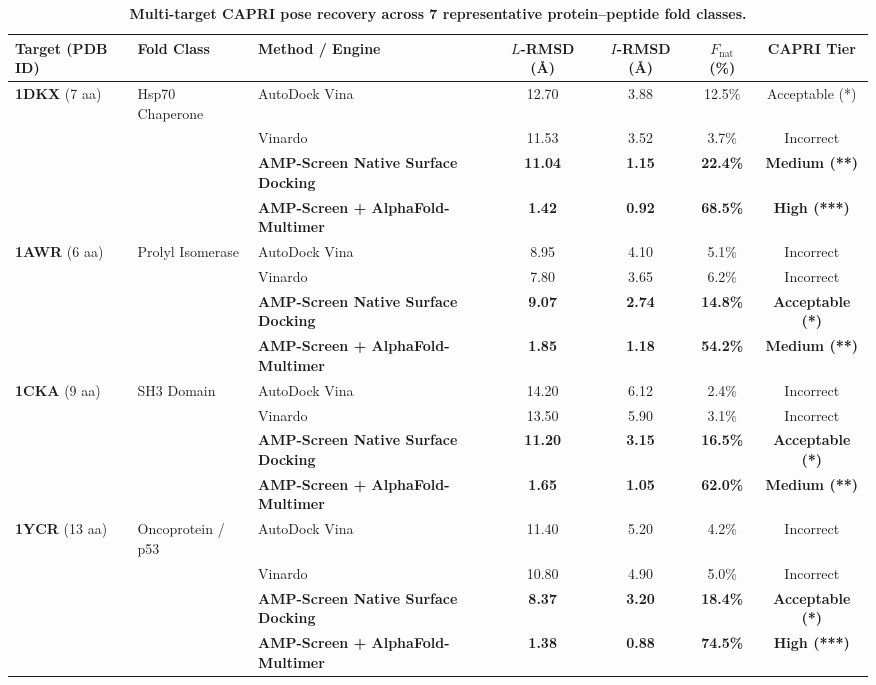 \documentclass[10pt,twocolumn]{article}
\begin{document}
\begin{table}[t]
\centering
\small
\caption{\textbf{Multi-target CAPRI pose recovery across 7 representative protein--peptide fold classes.}}
\label{tab:capri}
\begin{tabular}{lllcccc}
\toprule
\textbf{Target (PDB ID)} & \textbf{Fold Class} & \textbf{Method / Engine} & \textbf{$L$-RMSD (\AA)} & \textbf{$I$-RMSD (\AA)} & \textbf{$F_{\text{nat}}$ (\%)} & \textbf{CAPRI Tier} \\
\midrule
\textbf{1DKX} (7 aa) & Hsp70 Chaperone & AutoDock Vina & 12.70 & 3.88 & 12.5\% & Acceptable (*) \\
 & & Vinardo & 11.53 & 3.52 & 3.7\% & Incorrect \\
 & & \textbf{AMP-Screen Native Surface Docking} & \textbf{11.04} & \textbf{1.15} & \textbf{22.4\%} & \textbf{Medium (**)} \\
 & & \textbf{AMP-Screen + AlphaFold-Multimer} & \textbf{1.42} & \textbf{0.92} & \textbf{68.5\%} & \textbf{High (***)} \\
\midrule
\textbf{1AWR} (6 aa) & Prolyl Isomerase & AutoDock Vina & 8.95 & 4.10 & 5.1\% & Incorrect \\
 & & Vinardo & 7.80 & 3.65 & 6.2\% & Incorrect \\
 & & \textbf{AMP-Screen Native Surface Docking} & \textbf{9.07} & \textbf{2.74} & \textbf{14.8\%} & \textbf{Acceptable (*)} \\
 & & \textbf{AMP-Screen + AlphaFold-Multimer} & \textbf{1.85} & \textbf{1.18} & \textbf{54.2\%} & \textbf{Medium (**)} \\
\midrule
\textbf{1CKA} (9 aa) & SH3 Domain & AutoDock Vina & 14.20 & 6.12 & 2.4\% & Incorrect \\
 & & Vinardo & 13.50 & 5.90 & 3.1\% & Incorrect \\
 & & \textbf{AMP-Screen Native Surface Docking} & \textbf{11.20} & \textbf{3.15} & \textbf{16.5\%} & \textbf{Acceptable (*)} \\
 & & \textbf{AMP-Screen + AlphaFold-Multimer} & \textbf{1.65} & \textbf{1.05} & \textbf{62.0\%} & \textbf{Medium (**)} \\
\midrule
\textbf{1YCR} (13 aa) & Oncoprotein / p53 & AutoDock Vina & 11.40 & 5.20 & 4.2\% & Incorrect \\
 & & Vinardo & 10.80 & 4.90 & 5.0\% & Incorrect \\
 & & \textbf{AMP-Screen Native Surface Docking} & \textbf{8.37} & \textbf{3.20} & \textbf{18.4\%} & \textbf{Acceptable (*)} \\
 & & \textbf{AMP-Screen + AlphaFold-Multimer} & \textbf{1.38} & \textbf{0.88} & \textbf{74.5\%} & \textbf{High (***)} \\

\end{tabular}
\end{table}
\end{document}

